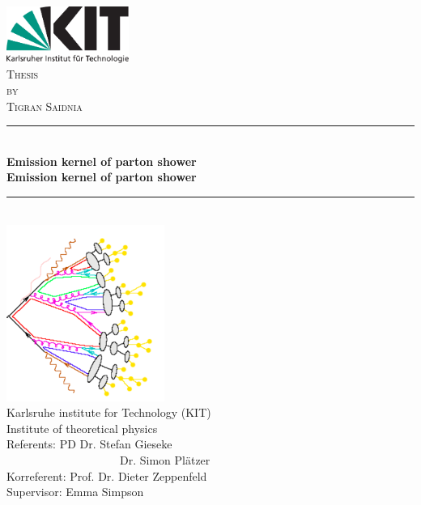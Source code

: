 \begin{titlepage}

\begin{center}


\includegraphics[width=0.3\textwidth]{images/Intro/kitlogo_de_rgb}\\[1cm]    

\textsc{\LARGE Thesis}\\[0.5cm]
\textsc{\Large by}\\[0.5cm]
\textsc{\Large Tigran Saidnia}\\[1.5cm]


\newcommand{\HRule}{\rule{\linewidth}{0.5mm}}
\HRule \\[0.8mm]
{\textbf{\Large \bfseries Emission kernel of parton shower}}\\[0.8mm]

{\textbf{\bfseries Emission kernel of parton shower}}\\[0.8mm]

\HRule \\[1cm]
\includegraphics[scale=0.7]{images/Intro/footPicture.PNG}\\[1cm]   
\Large Karlsruhe institute for Technology (KIT)\\[1.5mm]
\Large Institute of theoretical physics\\[1.5cm]
\Large Referents: PD Dr. Stefan Gieseke \\
\Large ~~~~~~~~~~~~~~~~~~~~Dr. Simon Plätzer\\
\Large Korreferent: Prof. Dr. Dieter Zeppenfeld\\

\Large Supervisor: Emma Simpson\\

\vfill


\end{center}

\end{titlepage}